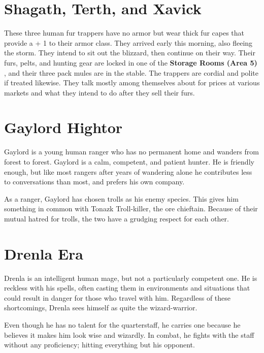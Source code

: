 \documentclass[a5paper,11pt,twoside]{book}
\newcommand{\MapText}[1]{
	{\color{DarkCyan} \textbf{#1}}
}
\begin{document}
{{{{ \section*{Shagath, Terth, and Xavick} These three human fur trappers have no armor but wear thick fur capes that provide a + 1 to their armor class.
They arrived early this morning, also fleeing the storm.
They intend to sit out the blizzard, then continue on their way.
Their furs, pelts, and hunting gear are locked in one of the \MapText{Storage Rooms (Area 5)}, and their three pack mules are in the stable.
The trappers are cordial and polite if treated likewise.
They talk mostly among themselves about for prices at various markets and what they intend to do after they sell their furs.
 \section*{Gaylord Hightor} Gaylord is a young human ranger who has no permanent home and wanders from forest to forest.
Gaylord is a calm, competent, and patient hunter.
He is friendly enough, but like most rangers after years of wandering alone he contributes less to conversations than most, and prefers his own company.

As a ranger, Gaylord has chosen trolls as his enemy species.
This gives him something in common with Tonazk Troll-killer, the ore chieftain.
Because of their mutual hatred for trolls, the two have a grudging respect for each other.
 \section*{Drenla Era} Drenla is an intelligent human mage, but not a particularly competent one.
He is reckless with his spells, often casting them in environments and situations that could result in danger for those who travel with him.
Regardless of these shortcomings, Drenla sees himself as quite the wizard-warrior.

Even though he has no talent for the quarterstaff, he carries one because he believes it makes him look wise and wizardly.
In combat, he fights with the staff without any proficiency; hitting everything but his opponent.
}}}}
\end{document}
